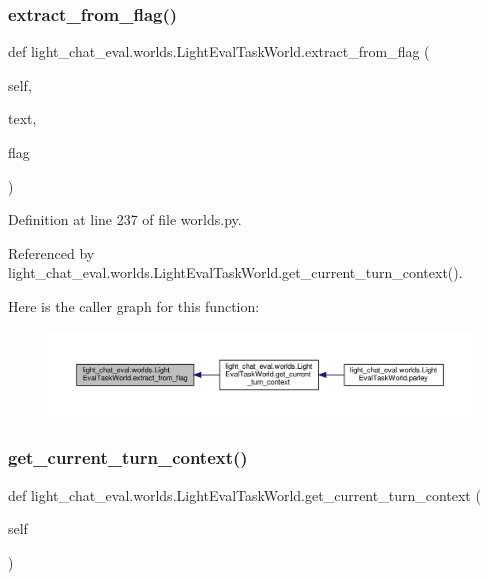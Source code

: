 \subsubsection{\texorpdfstring{extract\+\_\+from\+\_\+flag()}{extract\_from\_flag()}}
{\footnotesize\ttfamily def light\+\_\+chat\+\_\+eval.\+worlds.\+Light\+Eval\+Task\+World.\+extract\+\_\+from\+\_\+flag (\begin{DoxyParamCaption}\item[{}]{self,  }\item[{}]{text,  }\item[{}]{flag }\end{DoxyParamCaption})}



Definition at line 237 of file worlds.\+py.



Referenced by light\+\_\+chat\+\_\+eval.\+worlds.\+Light\+Eval\+Task\+World.\+get\+\_\+current\+\_\+turn\+\_\+context().

Here is the caller graph for this function\+:
\nopagebreak
\begin{figure}[H]
\begin{center}
\leavevmode
\includegraphics[width=350pt]{classlight__chat__eval_1_1worlds_1_1LightEvalTaskWorld_a0530e173b2c53acc0129ff45b628fece_icgraph}
\end{center}
\end{figure}
\mbox{\label{classlight__chat__eval_1_1worlds_1_1LightEvalTaskWorld_a55840132c24a5cd4147123774ed4dd55}} 
\subsubsection{\texorpdfstring{get\+\_\+current\+\_\+turn\+\_\+context()}{get\_current\_turn\_context()}}
{\footnotesize\ttfamily def light\+\_\+chat\+\_\+eval.\+worlds.\+Light\+Eval\+Task\+World.\+get\+\_\+current\+\_\+turn\+\_\+context (\begin{DoxyParamCaption}\item[{}]{self }\end{DoxyParamCaption})}



